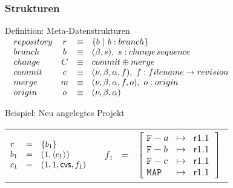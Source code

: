 \documentclass[german, presentation]{beamer}
\begin{document}
\begin{frame}
  \frametitle{Strukturen}

  \begin{block}{Definition: Meta-Datenstrukturen}
    \medskip
    $\begin{array}{@{\hspace{1em}}lccl}
      \STRUCT{repository} & r & \equiv & \{b\ |\ b : \STRUCT{branch}\} \\
      \STRUCT{branch}     & b & \equiv &
      (\beta, s),\ s : \STRUCT{change\,sequence} \\
      \STRUCT{change}     & C & \equiv &
      \STRUCT{commit}\oplus\STRUCT{merge} \\
      \STRUCT{commit}     & c & \equiv &
      (\nu, \beta, \alpha, f),\ f : \STRUCT{filename}\to
      \STRUCT{revision} \\
      \STRUCT{merge}      & m & \equiv &
      (\nu, \beta, \alpha, f, o),\ o : \STRUCT{origin} \\
      \STRUCT{origin}     & o & \equiv &
      (\nu, \beta, \alpha)      \end{array}$
  \end{block}

  \begin{block}{Beispiel: Neu angelegtes Projekt}
    \medskip
    \begin{tabular}{@{\hspace{1em}}ll}
      $\begin{array}{@{}lcl}
        r   &=& \{b_1\} \\
        b_1 &=& (1, \langle c_1 \rangle) \\
        c_1 &=& (1, 1, \mathsf{cvs}, f_1)
      \end{array}$ &
      $\begin{array}{lcl}
        f_1 &=& \left[
          \begin{array}{lcl}
            \mathtt{F-}a & \mapsto & \mathsf{r1.1} \\
            \mathtt{F-}b & \mapsto & \mathsf{r1.1} \\
            \mathtt{F-}c & \mapsto & \mathsf{r1.1} \\
            \mathtt{MAP} & \mapsto & \mathsf{r1.1}
          \end{array}
        \right]
      \end{array}$
    \end{tabular}
  \end{block}
\end{frame}
\end{document}
